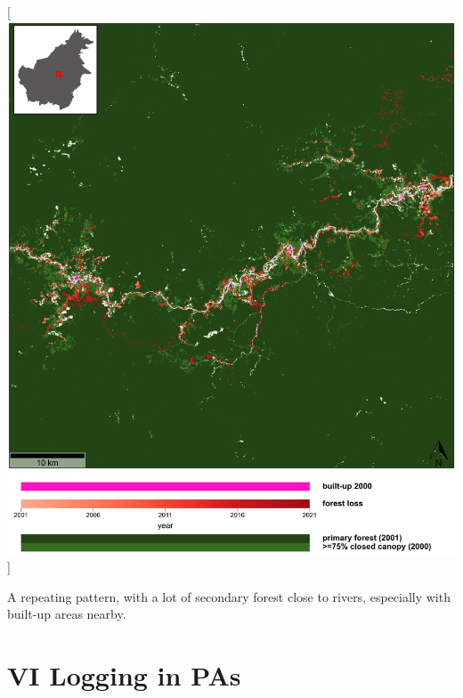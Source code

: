\documentclass[
  letterpaper,
  DIV=11,
  numbers=noendperiod]{scrreprt}
\begin{document}
{[}\includegraphics[width=1\textwidth,height=\textheight]{text/../code/results/maps/reason_secondary_rivers.png}{]}
\normalcolor

A repeating pattern, with a lot of secondary forest close to rivers,
especially with built-up areas nearby. \newpage

\hypertarget{logging-in-pas}{%
\section*{\texorpdfstring{\textsc{VI} Logging in
PAs}{ Logging in PAs}}\label{logging-in-pas}}


\color{white}
\end{document}

